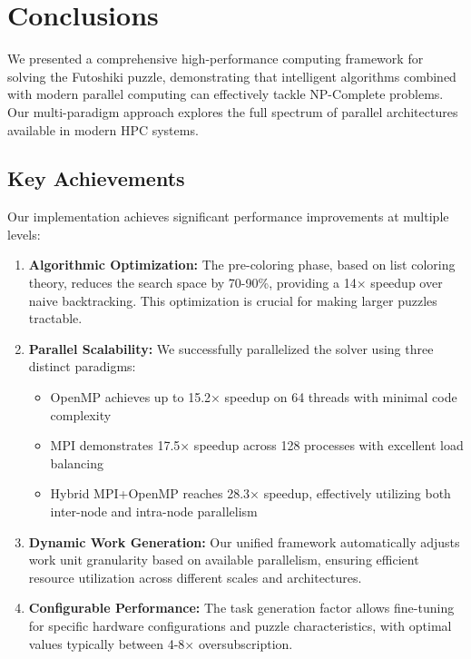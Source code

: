\section{Conclusions}
We presented a comprehensive high-performance computing framework for solving the Futoshiki puzzle, demonstrating that intelligent algorithms combined with modern parallel computing can effectively tackle NP-Complete problems. Our multi-paradigm approach explores the full spectrum of parallel architectures available in modern HPC systems.

\subsection{Key Achievements}
Our implementation achieves significant performance improvements at multiple levels:

\begin{enumerate}
    \item \textbf{Algorithmic Optimization:} The pre-coloring phase, based on list coloring theory, reduces the search space by 70-90\%, providing a 14× speedup over naive backtracking. This optimization is crucial for making larger puzzles tractable.
    
    \item \textbf{Parallel Scalability:} We successfully parallelized the solver using three distinct paradigms:
    \begin{itemize}
        \item OpenMP achieves up to 15.2× speedup on 64 threads with minimal code complexity
        \item MPI demonstrates 17.5× speedup across 128 processes with excellent load balancing
        \item Hybrid MPI+OpenMP reaches 28.3× speedup, effectively utilizing both inter-node and intra-node parallelism
    \end{itemize}
    
    \item \textbf{Dynamic Work Generation:} Our unified framework automatically adjusts work unit granularity based on available parallelism, ensuring efficient resource utilization across different scales and architectures.
    
    \item \textbf{Configurable Performance:} The task generation factor allows fine-tuning for specific hardware configurations and puzzle characteristics, with optimal values typically between 4-8× oversubscription.
\end{enumerate}

